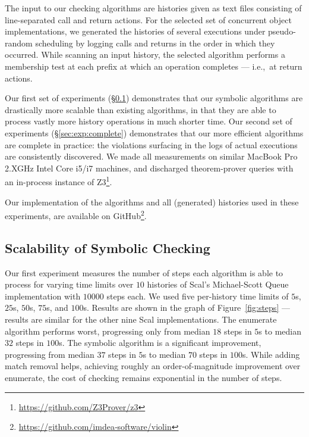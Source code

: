 The input to our checking algorithms are histories given as text files
consisting of line-separated call and return actions. For the selected set of
concurrent object implementations, we generated the histories of several
executions under pseudo-random scheduling by logging calls and returns in the
order in which they occurred. While scanning an input history, the selected
algorithm performs a membership test at each prefix at which an operation
completes --- i.e.,~at return actions.

Our first set of experiments (\S\ref{sec:exp:scalable}) demonstrates that our
symbolic algorithms are drastically more scalable than existing algorithms, in
that they are able to process vastly more history operations in much shorter
time. Our second set of experiments (\S\ref{sec:exp:complete}) demonstrates
that our more efficient algorithms are complete in practice: the violations
surfacing in the logs of actual executions are consistently discovered. We made
all measurements on similar MacBook Pro 2.XGHz Intel Core i5/i7 machines, and
discharged theorem-prover queries with an in-process instance of
Z3\footnote{\url{https://github.com/Z3Prover/z3}}.

Our implementation of the algorithms and all (generated) histories used in
these experiments, are available on
GitHub\footnote{\url{https://github.com/imdea‑software/violin}}.

\subsection{Scalability of Symbolic Checking}
\label{sec:exp:scalable}

Our first experiment measures the number of steps each algorithm is able to
process for varying time limits over $10$ histories of Scal’s Michael-Scott
Queue implementation with $10000$ steps each. We used five per-history time
limits of $5$s, $25$s, $50$s, $75$s, and $100$s. Results are shown in the graph
of Figure~\ref{fig:steps} — results are similar for the other nine Scal
implementations. The {\sc enumerate} algorithm performs worst, progressing only
from median $18$ steps in $5$s to median $32$ steps in $100$s. The {\sc
symbolic} algorithm is a significant improvement, progressing from median $37$
steps in $5$s to median $70$ steps in $100$s. While adding match removal helps,
achieving roughly an order-of-magnitude improvement over {\sc enumerate}, the
cost of checking remains exponential in the number of steps.

